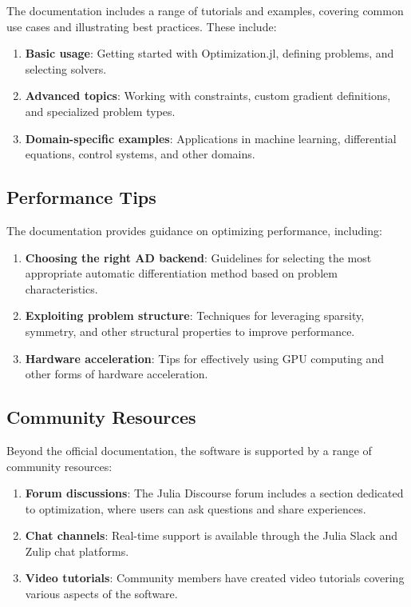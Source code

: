 The documentation includes a range of tutorials and examples, covering common use cases and illustrating best practices. These include:

\begin{enumerate}
\item \textbf{Basic usage}: Getting started with Optimization.jl, defining problems, and selecting solvers.

\item \textbf{Advanced topics}: Working with constraints, custom gradient definitions, and specialized problem types.

\item \textbf{Domain-specific examples}: Applications in machine learning, differential equations, control systems, and other domains.
\end{enumerate}

\subsection{Performance Tips}

The documentation provides guidance on optimizing performance, including:

\begin{enumerate}
\item \textbf{Choosing the right AD backend}: Guidelines for selecting the most appropriate automatic differentiation method based on problem characteristics.

\item \textbf{Exploiting problem structure}: Techniques for leveraging sparsity, symmetry, and other structural properties to improve performance.

\item \textbf{Hardware acceleration}: Tips for effectively using GPU computing and other forms of hardware acceleration.
\end{enumerate}

\subsection{Community Resources}

Beyond the official documentation, the software is supported by a range of community resources:

\begin{enumerate}
\item \textbf{Forum discussions}: The Julia Discourse forum includes a section dedicated to optimization, where users can ask questions and share experiences.

\item \textbf{Chat channels}: Real-time support is available through the Julia Slack and Zulip chat platforms.

\item \textbf{Video tutorials}: Community members have created video tutorials covering various aspects of the software.
\end{enumerate}

